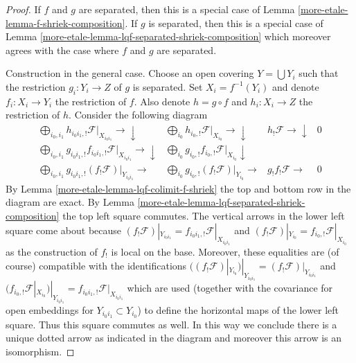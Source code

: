 \begin{proof}
If $f$ and $g$ are separated, then this is a special case of
Lemma \ref{more-etale-lemma-f-shriek-composition}.
If $g$ is separated, then this is a special case of
Lemma \ref{more-etale-lemma-lqf-separated-shriek-composition}
which moreover agrees with the case where $f$ and $g$ are separated.

\medskip\noindent
Construction in the general case. Choose an open covering $Y = \bigcup Y_i$
such that the restriction $g_i : Y_i \to Z$ of $g$ is separated.
Set $X_i = f^{-1}(Y_i)$ and denote $f_i : X_i \to Y_i$ the restriction
of $f$. Also denote $h = g \circ f$ and $h_i : X_i \to Z$ the restriction
of $h$. Consider the following diagram
$$
\begin{array}{cccc}\bigoplus\nolimits_{i_0, i_1}
h_{i_0i_1, !}\mathcal{F}|_{X_{i_0i_1}} \longrightarrow\downarrow & \bigoplus\nolimits_{i_0} h_{i_0, !}\mathcal{F}|_{X_{i_0}} \longrightarrow\downarrow & h_!\mathcal{F} \longrightarrow\downarrow & 0 \\ \bigoplus\nolimits_{i_0, i_1}
g_{i_0i_1, !} f_{i_0i_1, !}\mathcal{F}|_{X_{i_0i_1}} \longrightarrow\downarrow & \bigoplus\nolimits_{i_0}
g_{i_0, !} f_{i_0, !}\mathcal{F}|_{X_{i_0}} \downarrow &  &  \\ \bigoplus\nolimits_{i_0, i_1}
g_{i_0i_1, !} (f_!\mathcal{F})|_{Y_{i_0i_1}} \longrightarrow & \bigoplus\nolimits_{i_0}
g_{i_0, !} (f_!\mathcal{F})|_{Y_{i_0}} \longrightarrow & g_!f_!\mathcal{F} \longrightarrow & 0\end{array}
$$
By Lemma \ref{more-etale-lemma-lqf-colimit-f-shriek} the top and bottom row
in the diagram are exact. By Lemma \ref{more-etale-lemma-lqf-separated-shriek-composition}
the top left square commutes. The vertical arrows in the
lower left square come about because
$(f_!\mathcal{F})|_{Y_{i_0i_1}} = f_{i_0i_1, !}\mathcal{F}|_{X_{i_0i_1}}$ and
$(f_!\mathcal{F})|_{Y_{i_0}} = f_{i_0, !}\mathcal{F}|_{X_{i_0}}$
as the construction of $f_!$ is local on the base. Moreover, these
equalities are (of course) compatible with the identifications
$((f_!\mathcal{F})|_{Y_{i_0}})|_{Y_{i_0i_1}} =
(f_!\mathcal{F})|_{Y_{i_0i_1}}$ and
$(f_{i_0, !}\mathcal{F}|_{X_{i_0}})|_{Y_{i_0i_1}} =
f_{i_0i_1, !}\mathcal{F}|_{X_{i_0i_1}}$
which are used (together with the covariance for open embeddings
for $Y_{i_0i_1} \subset Y_{i_0}$)
to define the horizontal maps of the lower left square.
Thus this square commutes as well.
In this way we conclude there is a unique
dotted arrow as indicated in the diagram and
moreover this arrow is an isomorphism.


\end{proof}
